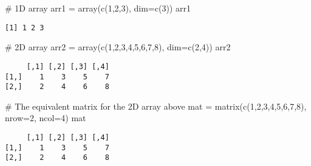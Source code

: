 \documentclass[
  letterpaper,
  DIV=11,
  numbers=noendperiod]{scrartcl}
\newenvironment{Shaded}{\begin{snugshade}}{\end{snugshade}}
\newcommand{\AttributeTok}[1]{\textcolor[rgb]{0.40,0.45,0.13}{#1}}
\newcommand{\CommentTok}[1]{\textcolor[rgb]{0.37,0.37,0.37}{#1}}
\newcommand{\DecValTok}[1]{\textcolor[rgb]{0.68,0.00,0.00}{#1}}
\newcommand{\FunctionTok}[1]{\textcolor[rgb]{0.28,0.35,0.67}{#1}}
\newcommand{\NormalTok}[1]{\textcolor[rgb]{0.00,0.23,0.31}{#1}}
\newcommand{\OtherTok}[1]{\textcolor[rgb]{0.00,0.23,0.31}{#1}}
\begin{document}
\begin{Shaded}
\begin{Highlighting}[]
\CommentTok{\# 1D array}
\NormalTok{arr1 }\OtherTok{=} \FunctionTok{array}\NormalTok{(}\FunctionTok{c}\NormalTok{(}\DecValTok{1}\NormalTok{,}\DecValTok{2}\NormalTok{,}\DecValTok{3}\NormalTok{), }\AttributeTok{dim=}\FunctionTok{c}\NormalTok{(}\DecValTok{3}\NormalTok{))}
\NormalTok{arr1}
\end{Highlighting}
\end{Shaded}

\begin{verbatim}
[1] 1 2 3
\end{verbatim}

\begin{Shaded}
\begin{Highlighting}[]
\CommentTok{\# 2D array}
\NormalTok{arr2 }\OtherTok{=} \FunctionTok{array}\NormalTok{(}\FunctionTok{c}\NormalTok{(}\DecValTok{1}\NormalTok{,}\DecValTok{2}\NormalTok{,}\DecValTok{3}\NormalTok{,}\DecValTok{4}\NormalTok{,}\DecValTok{5}\NormalTok{,}\DecValTok{6}\NormalTok{,}\DecValTok{7}\NormalTok{,}\DecValTok{8}\NormalTok{), }\AttributeTok{dim=}\FunctionTok{c}\NormalTok{(}\DecValTok{2}\NormalTok{,}\DecValTok{4}\NormalTok{))}
\NormalTok{arr2}
\end{Highlighting}
\end{Shaded}

\begin{verbatim}
     [,1] [,2] [,3] [,4]
[1,]    1    3    5    7
[2,]    2    4    6    8
\end{verbatim}

\begin{Shaded}
\begin{Highlighting}[]
\CommentTok{\# The equivalent matrix for the 2D array above}
\NormalTok{mat }\OtherTok{=} \FunctionTok{matrix}\NormalTok{(}\FunctionTok{c}\NormalTok{(}\DecValTok{1}\NormalTok{,}\DecValTok{2}\NormalTok{,}\DecValTok{3}\NormalTok{,}\DecValTok{4}\NormalTok{,}\DecValTok{5}\NormalTok{,}\DecValTok{6}\NormalTok{,}\DecValTok{7}\NormalTok{,}\DecValTok{8}\NormalTok{),}
             \AttributeTok{nrow=}\DecValTok{2}\NormalTok{,}
             \AttributeTok{ncol=}\DecValTok{4}\NormalTok{)}
\NormalTok{mat}
\end{Highlighting}
\end{Shaded}

\begin{verbatim}
     [,1] [,2] [,3] [,4]
[1,]    1    3    5    7
[2,]    2    4    6    8
\end{verbatim}
\end{document}
